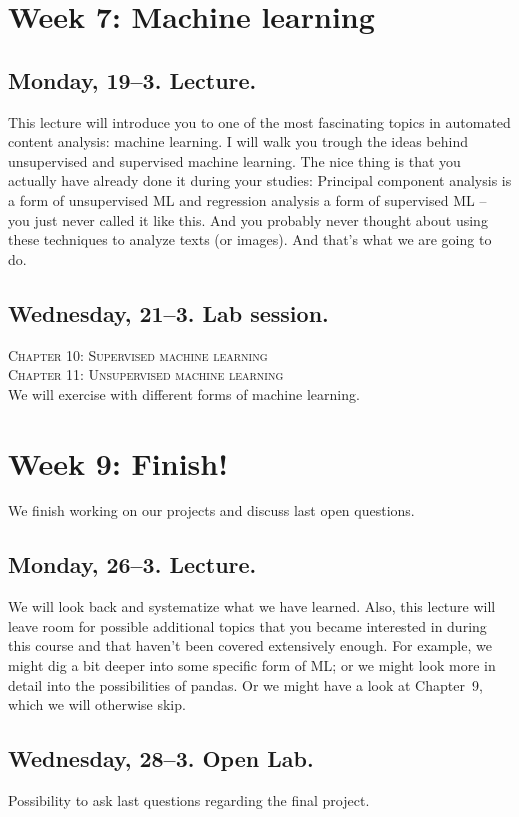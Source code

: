 \documentclass[a4paper,12pt]{report}
\begin{document}
\section*{Week 7: Machine learning}

\subsection*{Monday, 19--3. Lecture.}
This lecture will introduce you to one of the most fascinating topics in automated content analysis: machine learning. I will walk you trough the ideas behind unsupervised and supervised machine learning. The nice thing is that you actually have already done it during your studies: Principal component analysis is a form of unsupervised ML and regression analysis a form of supervised ML -- you just never called it like this. And you probably never thought about using these techniques to analyze texts (or images). And that's what we are going to do.

\subsection*{Wednesday, 21--3. Lab session.}
\textsc{ Chapter 10: Supervised machine learning}\\
\textsc{ Chapter 11: Unsupervised machine learning}\\
We will exercise with different forms of machine learning. 


\section*{Week 9: Finish!}
We finish working on our projects and discuss last open questions. 

\subsection*{Monday, 26--3. Lecture.}
We will look back and systematize what we have learned. Also, this lecture will leave room for possible additional topics that you became interested in during this course and that haven't been covered extensively enough. For example, we might dig a bit deeper into some specific form of ML; or we might look more in detail into the possibilities of pandas. Or we might have a look at Chapter~9, which we will otherwise skip.


\subsection*{Wednesday, 28--3. Open Lab.}
Possibility to ask last questions regarding the final project.
\end{document}
